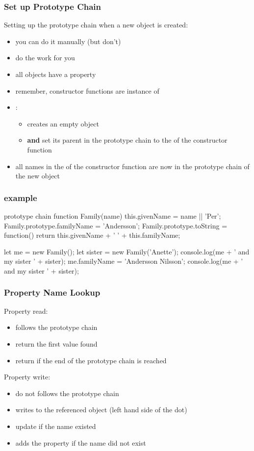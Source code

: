 \begin{frame}[fragile] \frametitle{Set up Prototype Chain}
Setting up the prototype chain when a new object is created:
\begin{itemize}
  \item you can do it manually (but don't)
  \item {} do the work for you
  \item all  objects have a property 
  \item remember, constructor functions are instance of 
  \item {}:
  \begin{itemize}
    \item creates an empty object
    \item {\bf and} set its parent in the prototype chain to the  of the constructor function
  \end{itemize}
  \item all names in the  of the constructor function are now in the prototype chain of the new object
\end{itemize}
\end{frame}

\begin{frame}[fragile] \frametitle{example}
\begin{CodeBox}{prototype chain}
function Family(name) {
  this.givenName = name || 'Per';
}
Family.prototype.familyName = 'Andersson';
Family.prototype.toString = function() {
  return this.givenName + ' ' + this.familyName;
}

let me = new Family();
let sister = new Family('Anette');
console.log(me + ' and my sister ' + sister);
me.familyName = 'Andersson Nilsson';
console.log(me + ' and my sister ' + sister);
\end{CodeBox}
\end{frame}

\begin{frame}[fragile] \frametitle{Property Name Lookup}
Property read:
\begin{itemize}
  \item follows the prototype chain
  \item return the first value found
  \item return  if the end of the prototype chain is reached
\end{itemize}
\vspace{8mm}
Property write:
\begin{itemize}
  \item do not follows the prototype chain
  \item writes to the referenced object (left hand side of the dot)
  \item update if the name existed
  \item adds the property if the name did not exist
\end{itemize}
\end{frame}

